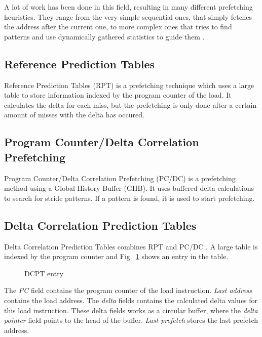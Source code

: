 A lot of work has been done in this field, resulting in many different prefetching heuristics. They
range from the very simple sequential ones, that simply fetches the address after the current one,
to more complex ones that tries to find patterns and use dynamically gathered statistics to guide
them \cite{prefetch_range}.

\subsection{Reference Prediction Tables}
Reference Prediction Tables (RPT) \cite{rpt} is a prefetching technique which uses a large table to
store information indexed by the program counter of the load. It calculates the delta for each miss,
but the prefetching is only done after a certain amount of misses with the delta has occured.

\subsection{Program Counter/Delta Correlation Prefetching}
Program Counter/Delta Correlation Prefetching (PC/DC) \cite{prefetch_range} is a prefetching method
using a Global History Buffer (GHB). It uses buffered delta calculations to search for stride
patterns. If a pattern is found, it is used to start prefetching.

\subsection{Delta Correlation Prediction Tables} 
Delta Correlation Prediction Tables combines RPT and PC/DC \cite{dcpt}. A large table is indexed by the program counter and Fig.~\ref{fig:dcpt_entry} shows an
entry in the table.
\begin{figure}[h]
	\begin{center}
	\end{center}
	\caption{DCPT entry\label{fig:dcpt_entry}}
\end{figure}
The \emph{PC} field contains the program counter of the load instruction. \emph{Last address}
contains the load address. The \emph{delta} fields contains the calculated delta values for this
load instruction. These delta fields works as a circular buffer, where the \emph{delta pointer}
field points to the head of the buffer. \emph{Last prefetch} stores the last prefetch address. 

